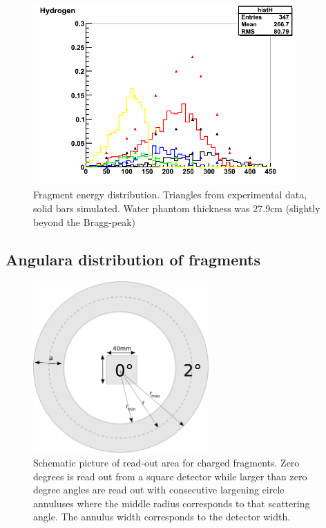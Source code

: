 \begin{figure}[h] 
\begin{center}
\includegraphics[width=0.9\textwidth]{images/fragmentEnergyDistr.png}  
\caption{\label{fig:fragmentEnergyDistr} Fragment energy distribution. Triangles from experimental data, solid bars simulated. Water phantom thickness was 27.9cm (slightly beyond the Bragg-peak)}
\end{center}
\end{figure}

\subsection{Angulara distribution of fragments}
\begin{figure}[h] 
\begin{center}
\includegraphics[width=0.6\textwidth]{images/annulus.png}  
\caption{\label{fig:annulusesExplained} Schematic picture of read-out area for charged fragments. Zero degrees is read out from a square detector while larger than zero degree angles are read out with consecutive largening circle annuluses where the middle radius corresponds to that scattering angle. The annulus width corresponds to the detector width.}
\end{center}
\end{figure}

